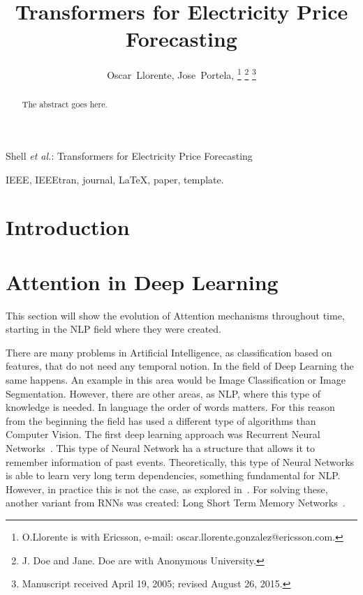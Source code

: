 \documentclass[journal]{IEEEtran}
\begin{document}
\title{Transformers for Electricity Price Forecasting}


\author{Oscar~Llorente,
        Jose~Portela,
\thanks{O.Llorente is with Ericsson, e-mail: oscar.llorente.gonzalez@ericsson.com.}%
\thanks{J. Doe and Jane. Doe are with Anonymous University.}%
\thanks{Manuscript received April 19, 2005; revised August 26, 2015.}}



%
{Shell \MakeLowercase{\textit{et al.}}: Transformers for Electricity Price Forecasting}




\maketitle

\begin{abstract}
The abstract goes here.
\end{abstract}

\begin{IEEEkeywords}
IEEE, IEEEtran, journal, \LaTeX, paper, template.
\end{IEEEkeywords}

\IEEEpeerreviewmaketitle



\section{Introduction}

\section{Attention in Deep Learning}
This section will show the evolution of Attention mechanisms throughout time, starting in the NLP field where they were created.

There are many problems in Artificial Intelligence, as classification based on features, that do not need any temporal notion. In the field of Deep Learning the same happens. An example in this area would be Image Classification or Image Segmentation. However, there are other areas, as NLP, where this type of knowledge is needed. In language the order of words matters. For this reason from the beginning the field has used a different type of algorithms than Computer Vision. The first deep learning approach was Recurrent Neural Networks~\cite{rumelhartLearningInternalRepresentations1987}. This type of Neural Network ha a structure that allows it to remember information of past events. Theoretically, this type of Neural Networks is able to learn very long term dependencies, something fundamental for NLP. However, in practice this is not the case, as explored in~\cite{bengioLearningLongtermDependencies1994}. For solving these, another variant from RNNs was created: Long Short Term Memory Networks~\cite{hochreiterLongShortTermMemory1997}.
\end{document}
